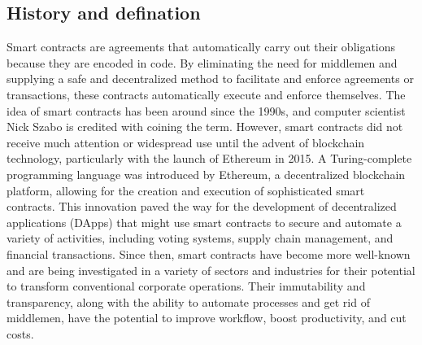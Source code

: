 \documentclass[../../Main.tex]{subfiles}
\begin{document}
\subsection{History and defination}
Smart contracts are agreements that automatically carry out their obligations because they are encoded in code. By eliminating the need for middlemen and supplying a safe and decentralized method to facilitate and enforce agreements or transactions, these contracts automatically execute and enforce themselves. The idea of smart contracts has been around since the 1990s, and computer scientist Nick Szabo \cite{szabo1997formalizing} is credited with coining the term. However, smart contracts did not receive much attention or widespread use until the advent of blockchain technology, particularly with the launch of Ethereum \cite{Ethereum} in 2015. A Turing-complete programming language was introduced by Ethereum, a decentralized blockchain platform, allowing for the creation and execution of sophisticated smart contracts. This innovation paved the way for the development of decentralized applications (DApps) that might use smart contracts to secure and automate a variety of activities, including voting systems, supply chain management, and financial transactions. Since then, smart contracts have become more well-known and are being investigated in a variety of sectors and industries for their potential to transform conventional corporate operations. Their immutability and transparency, along with the ability to automate processes and get rid of middlemen, have the potential to improve workflow, boost productivity, and cut costs.
\end{document}
